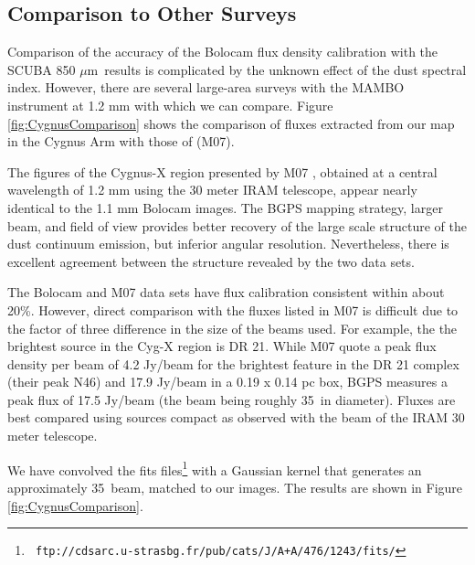 \documentclass[12pt,preprint]{aastex}
\newcommand{\mum}{\ensuremath{\mu \mathrm{m}}}
\begin{document}
\subsection{Comparison to Other Surveys}
\label{sec:motte}

Comparison of the accuracy of the Bolocam flux density calibration
with the SCUBA 850 \mum\ results is complicated by the unknown effect
of the dust spectral index.  However, there are several large-area
surveys with the MAMBO instrument at 1.2 mm with which we can compare.
Figure \ref{fig:CygnusComparison} shows the comparison of fluxes
extracted from our map in the Cygnus Arm with those of
\citet{motte07} (M07).

The figures of the Cygnus-X region presented by M07
, obtained at a central wavelength of 1.2 mm using the 30 meter IRAM
telescope, appear nearly identical to the 1.1 mm Bolocam images.  The
BGPS mapping strategy, larger beam, and field of view provides better
recovery of the large scale structure of the dust continuum emission,
but inferior angular resolution.  Nevertheless, there is excellent
agreement between the structure revealed by the two data sets.

The Bolocam and M07 data sets have flux calibration consistent within
about 20\%.  However, direct comparison with the fluxes listed in M07
is difficult due to the factor of three difference in the size of the
beams used.  For example, the the brightest source in the Cyg-X region
is DR 21.  While M07 quote a peak flux density per beam of
4.2 Jy/beam for the brightest feature in the DR 21 complex (their peak
N46) and 17.9 Jy/beam in a 0.19 x 0.14 pc box, BGPS measures a peak
flux of 17.5 Jy/beam (the beam being roughly 35\arcsec\ in diameter).
Fluxes are best compared using sources compact as observed with the
beam of the IRAM 30 meter telescope.

We have convolved the fits files\footnote{{\tt
ftp://cdsarc.u-strasbg.fr/pub/cats/J/A+A/476/1243/fits/}} with a
Gaussian kernel that generates an approximately 35\arcsec\ beam,
matched to our images.  The results are shown in Figure
\ref{fig:CygnusComparison}.
\end{document}
